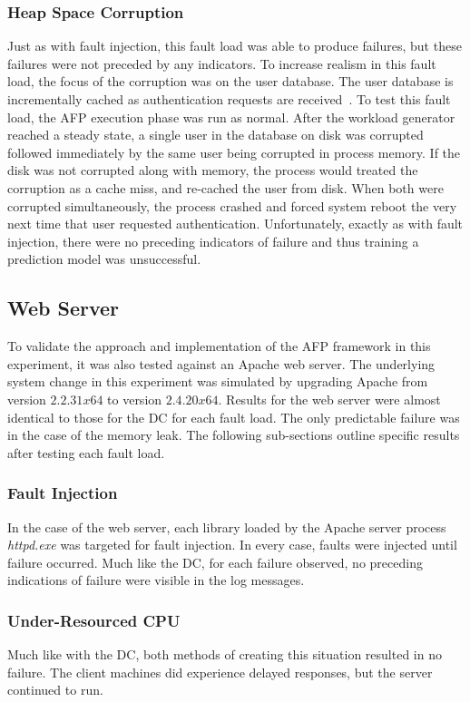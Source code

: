 \subsubsection{Heap Space Corruption}
Just as with fault injection, this fault load was able to produce failures, but
these failures were not preceded by any indicators.  To increase realism in
this fault load, the focus of the corruption was on the user database.  The
user database is incrementally cached as authentication requests are
received~\cite{russinovich2009}.  To test this fault load, the \ac{AFP}
execution phase was run as normal.  After the workload generator reached a
steady state, a single user in the database on disk was corrupted followed
immediately by the same user being corrupted in process memory.  If the disk
was not corrupted along with memory, the process would treated the corruption
as a cache miss, and re-cached the user from disk.  When both were corrupted
simultaneously, the process crashed and forced system reboot the very next time
that user requested authentication.  Unfortunately, exactly as with fault
injection, there were no preceding indicators of failure and thus training a
prediction model was unsuccessful.

\subsection{Web Server}
To validate the approach and implementation of the \ac{AFP} framework in this
experiment, it was also tested against an Apache web server.  The underlying
system change in this experiment was simulated by upgrading Apache from version
$2.2.31 x64$ to version $2.4.20 x64$.  Results for the web server were almost
identical to those for the \ac{DC} for each fault load.  The only predictable
failure was in the case of the memory leak.  The following sub-sections outline
specific results after testing each fault load.

\subsubsection{Fault Injection}
In the case of the web server, each library loaded by the Apache server process
\emph{httpd.exe} was targeted for fault injection.  In every case, faults were
injected until failure occurred.  Much like the \ac{DC}, for each failure
observed, no preceding indications of failure were visible in the log messages.

\subsubsection{Under-Resourced CPU}
Much like with the \ac{DC}, both methods of creating this situation resulted in
no failure.  The client machines did experience delayed responses, but the
server continued to run.


